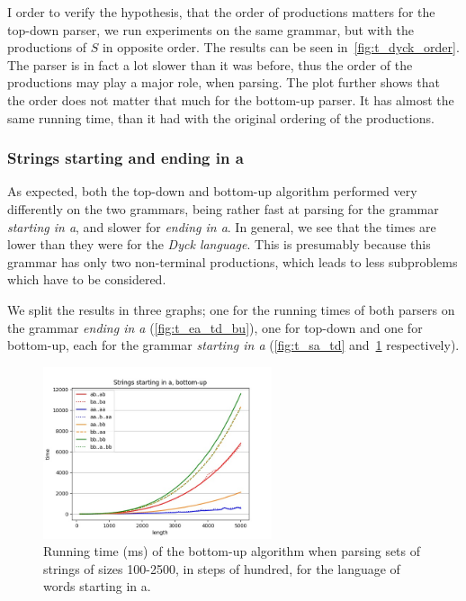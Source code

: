 I order to verify the hypothesis, that the order of productions matters for the top-down parser, we run experiments on the same grammar, but with the productions of $S$ in opposite order.
The results can be seen in~\cref{fig:t_dyck_order}.
The parser is in fact a lot slower than it was before, thus the order of the productions may play a major role, when parsing.
The plot further shows that the order does not matter that much for the bottom-up parser.
It has almost the same running time, than it had with the original ordering of the productions.

\subsubsection{Strings starting and ending in a}

As expected, both the top-down and bottom-up algorithm performed very differently on the two grammars, being rather fast at parsing for the grammar \textit{starting in a}, and slower for \textit{ending in a}.
In general, we see that the times are lower than they were for the \textit{Dyck language}.
This is presumably because this grammar has only two non-terminal productions, which leads to less subproblems which have to be considered.

We split the results in three graphs; one for the running times of both parsers on the grammar \textit{ending in a} (\cref{fig:t_ea_td_bu}), one for top-down and one for bottom-up, each for the grammar \textit{starting in a} (\cref{fig:t_sa_td} and~\cref{fig:t_sa_bu} respectively).

\begin{figure}[!ht]
    \centering
    \includegraphics[width=0.6\textwidth]{Resources/t_sa_bu.jpg}
    \caption{Running time (ms) of the bottom-up algorithm when parsing sets of strings of sizes 100-2500, in steps of hundred, for the language of words starting in a.}
    \label{fig:t_sa_bu}
\end{figure}

